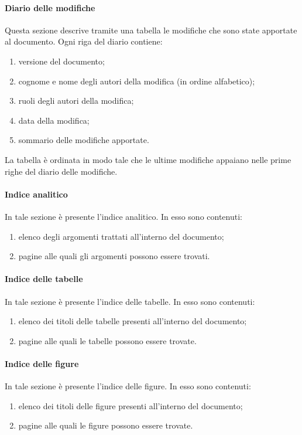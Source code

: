 			\paragraph{Diario delle modifiche}
				Questa sezione descrive tramite una tabella le modifiche che sono state apportate al documento. Ogni riga del diario contiene:
				\begin{enumerate}
					\item versione del documento;
					\item cognome e nome degli autori della modifica (in ordine alfabetico);
					\item ruoli degli autori della modifica;
					\item data della modifica;
					\item sommario delle modifiche apportate.
				\end{enumerate}
				La tabella è ordinata in modo tale che le ultime modifiche appaiano nelle prime righe del diario delle modifiche.
			\paragraph{Indice analitico}
				In tale sezione è presente l’indice analitico. In esso sono contenuti:
				\begin{enumerate}
					\item elenco degli argomenti trattati all’interno del documento;
					\item pagine alle quali gli argomenti possono essere trovati.
				\end{enumerate}
			\paragraph{Indice delle tabelle}
				In tale sezione è presente l’indice delle tabelle. In esso sono contenuti:
				\begin{enumerate}
					\item elenco dei titoli delle tabelle presenti all’interno del documento;
					\item pagine alle quali le tabelle possono essere trovate.
				\end{enumerate}
			\paragraph{Indice delle figure}
				In tale sezione è presente l’indice delle figure. In esso sono contenuti:
				\begin{enumerate}
					\item elenco dei titoli delle figure presenti all’interno del documento;
					\item pagine alle quali le figure possono essere trovate.
				\end{enumerate}

